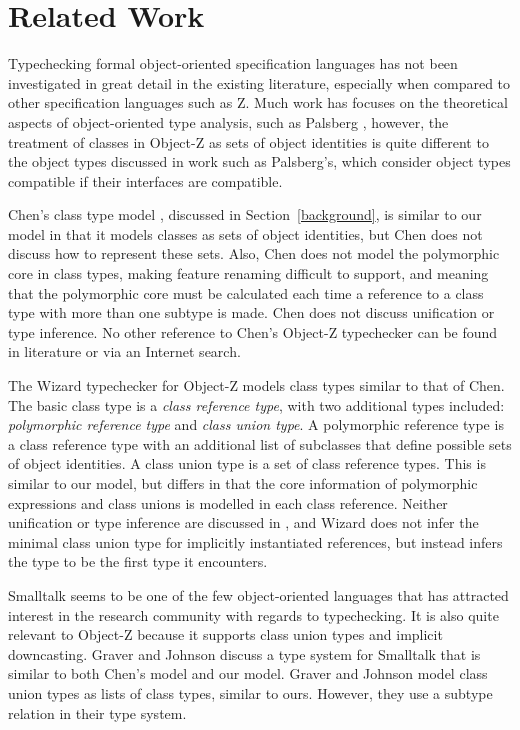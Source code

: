 \section{Related Work}

Typechecking formal object-oriented specification languages has not
been investigated in great detail in the existing literature,
especially when compared to other specification languages such as
Z. Much work has focuses on the theoretical aspects of
object-oriented type analysis, such as Palsberg \cite{palsberg95},
however, the treatment of classes in Object-Z as sets of object
identities is quite different to the object types discussed in work
such as Palsberg's, which consider object types compatible if their
interfaces are compatible.

Chen's class type model \cite{chen94}, discussed in
Section~\ref{background}, is similar to our model in that it models
classes as sets of object identities, but Chen does not discuss how to
represent these sets. Also, Chen does not model the polymorphic core
in class types, making feature renaming difficult to support, and
meaning that the polymorphic core must be calculated each time a
reference to a class type with more than one subtype is made. Chen
does not discuss unification or type inference. No other reference to
Chen's Object-Z typechecker can be found in literature or via an
Internet search.

The Wizard typechecker for Object-Z \cite{johnston96} models class
types similar to that of Chen. The basic class type is a {\em class
reference type}, with two additional types included: {\em polymorphic
reference type} and {\em class union type}. A polymorphic reference
type is a class reference type with an additional list of subclasses
that define possible sets of object identities. A class union type is
a set of class reference types. This is similar to our model, but
differs in that the core information of polymorphic expressions and
class unions is modelled in each class reference. Neither unification
or type inference are discussed in \cite{johnston96}, and Wizard does
not infer the minimal class union type for implicitly instantiated
references, but instead infers the type to be the first type it
encounters.

Smalltalk \cite{goldberg83} seems to be one of the few object-oriented
languages that has attracted interest in the research community with
regards to typechecking. It is also quite relevant to Object-Z because
it supports class union types and implicit downcasting. Graver and
Johnson \cite{graver90} discuss a type system for Smalltalk that is
similar to both Chen's model and our model. Graver and Johnson model
class union types as lists of class types, similar to ours. However,
they use a subtype relation in their type system.


